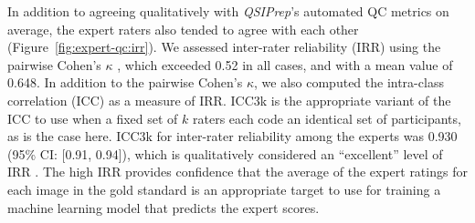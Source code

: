 \documentclass[9pt,lineno]{elife}
\begin{document}
In addition to agreeing qualitatively with \emph{QSIPrep}'s automated QC metrics
on average, the expert raters also tended to agree with each other (Figure~\ref{fig:expert-qc:irr}). We assessed
inter-rater reliability (IRR) using the pairwise Cohen's $\kappa$
\citep{di-eugenio2004-bb}, which exceeded 0.52 in all cases, and with a mean value of
0.648. In addition to the pairwise Cohen's $\kappa$, we also computed the
intra-class correlation (ICC) \citep{hallgren2012-ze} as a measure of IRR. ICC3k
is the appropriate variant of the ICC to use when a fixed set of $k$ raters each
code an identical set of participants, as is the case here. ICC3k for inter-rater
reliability among the experts was 0.930 (95\% CI: [0.91, 0.94]), which is
qualitatively considered an ``excellent'' level of IRR \citep{Cicchetti1994-fz}.
The high IRR provides confidence that the average of the expert ratings for each
image in the gold standard is an appropriate target to use for training a
machine learning model that predicts the expert scores.
\end{document}
